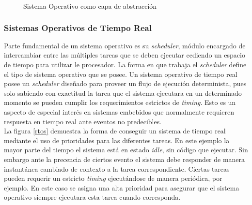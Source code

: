 \documentclass[11pt,letterpaper]{article}
\begin{document}
\begin{figure}[ht!]
\centering
{}
\caption{Sistema Operativo como capa de abstracción}\label{os}
\end{figure}

\subsubsection{Sistemas Operativos de Tiempo Real}
Parte fundamental de un sistema operativo es su \textit{scheduler}, módulo encargado de intercambiar entre las múltiples tareas que se deben ejecutar cediendo un espacio de tiempo para utilizar le procesador. La forma en que trabaja el \textit{scheduler} define el tipo de sistema operativo que se posee. Un sistema operativo de tiempo real posee un \textit{scheduler} diseñado para proveer un flujo de ejecución determinista, pues solo sabiendo con exactitud la tarea que el sistema ejecutara en un determinado momento se pueden cumplir los requerimientos estrictos de \textit{timing}\cite{FREERTOS}. Esto es un aspecto de especial interés en sistemas embebidos que normalmente requieren respuesta en tiempo real ante eventos no predecibles.\\

La figura \ref{rtos} demuestra la forma de conseguir un sistema de tiempo real mediante el uso de prioridades para las diferentes tareas. En este ejemplo la mayor parte del tiempo el sistema está en estado \textit{idle}, sin código que ejecutar. Sin embargo ante la precencia de ciertos evento el sistema debe responder de manera instantánea cambiado de contexto a la tarea correspondiente. Ciertas tareas pueden requerir un estricto \textit{timing} ejecutándose de manera periódica, por ejemplo. En este caso se asigna una alta prioridad para asegurar que el sistema operativo siempre ejecutara esta tarea cuando corresponda.
\end{document}
